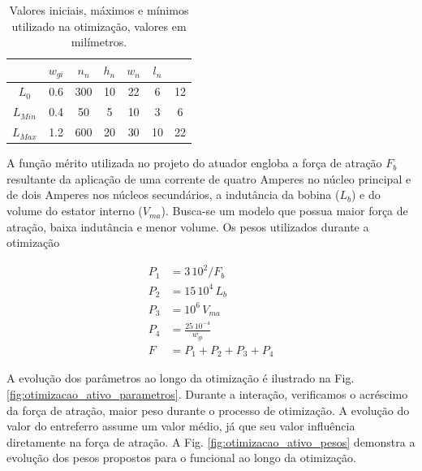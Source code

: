 \begin{table}[ht!]
	\centering
	\begin{tabular}{c c c c c c c}
					 & $w_{gi}$ & $n_n$ & $h_n$ & $w_n$ &  $l_n$   \\ \hline \hline
		$L_{0}$  &  0.6 & 300  &   10 &  22 & 6  &   12 \\
		$L_{Min}$&  0.4 & 50   &   5  &  10 & 3  &   6	\\
		$L_{Max}$ & 1.2 & 600  &   20 &  30 & 10 &   22
	\end{tabular} 
	\caption{Valores iniciais, máximos e mínimos utilizado na otimização, valores em milímetros.}
	\label{tab:ativo:restrições} 
\end{table}

A função mérito utilizada no projeto do atuador engloba a força de atração $F_b$ resultante da aplicação de uma corrente de quatro Amperes no núcleo principal e de dois Amperes nos núcleos secundários, a indutância da bobina ($L_b$) e do volume do estator interno ($V_{ma}$). Busca-se um modelo que possua maior força de atração, baixa indutância e menor volume. Os pesos utilizados durante a otimização 

\begin{align}
	P_1 &= 3 \, 10^2/ F_b \\
	P_2 &= 15 \, 10^4 \, L_b \\
	P_3 &= 10^6 \, V_{ma} \\
	P_4 &= \frac{25 \, 10^{-4}}{w_{gi}}				\\
	F   &= P_1 + P_2 + P_3 + P_4
\end{align}

A evolução dos parâmetros ao longo da otimização é ilustrado na Fig. \ref{fig:otimizacao_ativo_parametros}. Durante a interação, verificamos o acréscimo da força de atração,  maior peso durante o processo de otimização.  A evolução do valor do entreferro assume um valor médio, já que seu valor influência diretamente na força de atração. A Fig. \ref{fig:otimizacao_ativo_pesos} demonstra a evolução dos pesos propostos para o funcional ao longo da otimização.  

